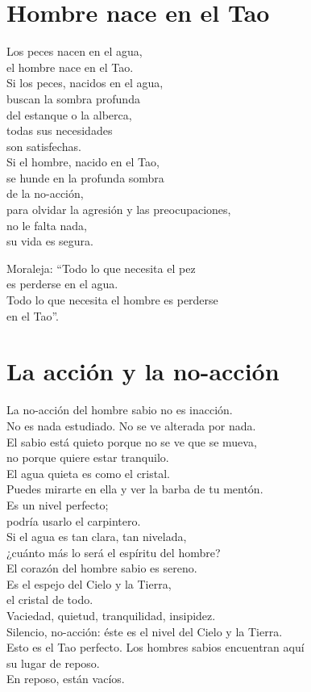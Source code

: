 \documentclass[book,b5paper,hidelinks,final]{memoir}
\begin{document}
	\chapter*{Hombre nace en el Tao}
	
	Los peces nacen en el agua,\\
	el hombre nace en el Tao.\\
	Si los peces, nacidos en el agua,\\
	buscan la sombra profunda\\
	del estanque o la alberca,\\
	todas sus necesidades\\
	son satisfechas.\\
	Si el hombre, nacido en el Tao,\\
	se hunde en la profunda sombra\\
	de la no-acción,\\
	para olvidar la agresión y las preocupaciones,\\
	no le falta nada,\\
	su vida es segura.
	
	Moraleja: ``Todo lo que necesita el pez\\
	es perderse en el agua.\\
	Todo lo que necesita el hombre es perderse\\
	en el Tao''.
	
	\chapter*{La acción y la no-acción}
	
	La no-acción del hombre sabio no es inacción.\\
	No es nada estudiado. No se ve alterada por nada.\\
	El sabio está quieto porque no se ve que se mueva,\\
	no porque quiere estar tranquilo.\\
	El agua quieta es como el cristal.\\
	Puedes mirarte en ella y ver la barba de tu mentón.\\
	Es un nivel perfecto;\\
	podría usarlo el carpintero.\\
	Si el agua es tan clara, tan nivelada,\\
	¿cuánto más lo será el espíritu del hombre?\\
	El corazón del hombre sabio es sereno.\\
	Es el espejo del Cielo y la Tierra,\\
	el cristal de todo.\\
	Vaciedad, quietud, tranquilidad, insipidez.\\
	Silencio, no-acción: éste es el nivel del Cielo y la Tierra.\\
	Esto es el Tao perfecto. Los hombres sabios encuentran aquí\\
	su lugar de reposo.\\
	En reposo, están vacíos.
	
\end{document}
